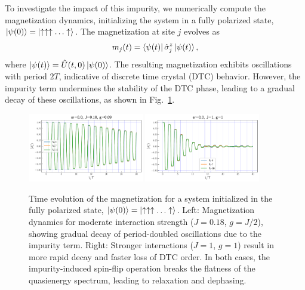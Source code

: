 \documentclass[a4paper, 10pt]{article}
\begin{document}
To investigate the impact of this impurity, we numerically compute the magnetization dynamics, initializing the system in a fully polarized state, $\ket{\psi(0)} = \ket{\uparrow \uparrow \uparrow \ldots \uparrow}$. The magnetization at site $j$ evolves as
\begin{align}
    m_j(t) = \bra{\psi(t)} \hat{\sigma}_j^z \ket{\psi(t)},
\end{align}
where $\ket{\psi(t)} = \hat{U}(t,0) \ket{\psi(0)}$. The resulting magnetization exhibits oscillations with period $2T$, indicative of discrete time crystal (DTC) behavior. However, the impurity term undermines the stability of the DTC phase, leading to a gradual decay of these oscillations, as shown in Fig.~\ref{figs:impure_flatband_dtc}.
\begin{figure}[h!]
    \centering
    \includegraphics[width=0.45\textwidth]{figs/mag_er0.0_J0.18_g0.09.pdf}
    \includegraphics[width=0.45\textwidth]{figs/mag_er0.0_J1_g1.pdf}
    \caption{Time evolution of the magnetization for a system initialized in the fully polarized state, $\ket{\psi(0)} = \ket{\uparrow \uparrow \uparrow \ldots \uparrow}$. Left: Magnetization dynamics for moderate interaction strength ($J=0.18$, $g=J/2$), showing gradual decay of period-doubled oscillations due to the impurity term. Right: Stronger interactions ($J=1$, $g=1$) result in more rapid decay and faster loss of DTC order. In both cases, the impurity-induced spin-flip operation breaks the flatness of the quasienergy spectrum, leading to relaxation and dephasing.}
    \label{figs:impure_flatband_dtc}
\end{figure}
\end{document}
